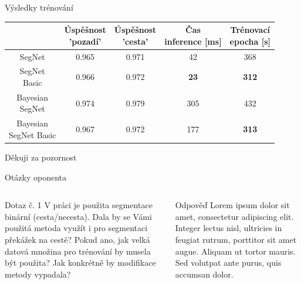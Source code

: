 \documentclass[aspectratio=1610]{beamer}
\begin{document}
\begin{frame}{Výsledky trénování}
\renewcommand{\arraystretch}{1.5}
\begin{table}[h]
	\centering	
	\begin{tabular}{|c|c|c|c|c|}
		\hline
		\thead{Architektura} & \thead{Úspěšnost \\ 'pozadí'} & \thead{Úspěšnost \\ 'cesta'} & \thead{Čas \\ inference [ms] } & \thead{Trénovací \\ epocha [s] }\\		
		\hline	
		SegNet & 0.965 & 0.971 & 42 & 368 \\	
		\hline	
		\makecell{SegNet \\ Basic} & 0.966 & 0.972 & \textbf{23} & \textbf{312} \\	
		\hline	
		\makecell{Bayesian \\ SegNet} & 0.974 & 0.979 & 305 & 432 \\	
		\hline	
		\makecell{Bayesian \\ SegNet Basic} & 0.967 & 0.972 & 177 & \textbf{313} \\
		\hline
	\end{tabular}
\end{table}
\end{frame}
\begin{frame}{}
	\centering
	{\Large Děkuji za pozornost}	
\end{frame}
\begin{frame}{Otázky oponenta}
\begin{columns}
\begin{exampleblock}{Dotaz č. 1}
V práci je použita segmentace binární (cesta/necesta). Dala by se Vámi použitá metoda využít i pro segmentaci překážek na cestě? Pokud ano, jak velká datová množina pro trénování by musela být použita? Jak konkrétně by modifikace metody vypadala?
\end{exampleblock}

\begin{block}{Odpověď}
Lorem ipsum dolor sit amet, consectetur adipiscing elit. Integer lectus nisl, ultricies in feugiat rutrum, porttitor sit amet augue. Aliquam ut tortor mauris. Sed volutpat ante purus, quis accumsan dolor.
\end{block}
\end{columns}
\end{frame}
\end{document}
